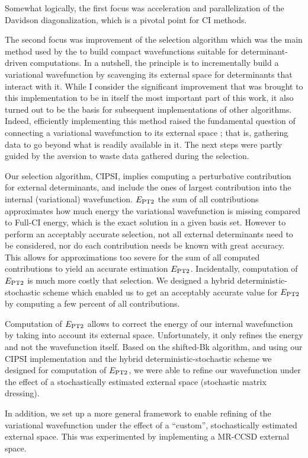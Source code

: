 \documentclass[12pt,a4paper]{report}
\begin{document}
Somewhat logically, the first focus was acceleration and parallelization of the Davidson diagonalization, which is a pivotal point for CI methods.

The second focus was improvement of the selection algorithm which was the main method used by the \QP to build compact wavefunctions suitable for determinant-driven computations. In a nutshell, the principle is to incrementally build a variational wavefunction by scavenging its external space for determinants that interact with it. While I consider the significant improvement that was brought to this implementation to be in itself the most important part of this work, it also turned out to be the basis for subsequent implementations of other algorithms. Indeed, efficiently implementing this method raised the fundamental question of connecting a variational wavefunction to its external space ; that is, gathering data to go beyond what is readily available in it. The next steps were partly guided by the aversion to waste data gathered during the selection.

Our selection algorithm, CIPSI, implies computing a perturbative contribution for external determinants, and include the ones of largest contribution into the internal (variational) wavefunction. $E_\text{PT2}$ the sum of all contributions approximates how much energy the variational wavefunction is missing compared to Full-CI energy, which is the exact solution in a given basis set. However to perform an acceptably accurate selection, not all external determinants need to be considered, nor do each contribution needs be known with great accuracy. This allows for approximations too severe for the sum of all computed contributions to yield an accurate estimation $E_\text{PT2}$. Incidentally, computation of $E_\text{PT2}$ is much more costly that selection. We designed a hybrid deterministic-stochastic scheme which enabled us to get an acceptably accurate value for $E_\text{PT2}$ by computing a few percent of all contributions.

Computation of $E_\text{PT2}$ allows to correct the energy of our internal wavefunction by taking into account its external space. Unfortunately, it only refines the energy and not the wavefunction itself. Based on the shifted-Bk algorithm, and using our CIPSI implementation and the hybrid deterministic-stochastic scheme we designed for computation of $E_\text{PT2}$, we were able to refine our wavefunction under the effect of a stochastically estimated external space (stochastic matrix dressing).

In addition, we set up a more general framework to enable refining of the variational wavefunction under the effect of a ``custom'', stochastically estimated external space. This was experimented by implementing a MR-CCSD external space.
\end{document}
